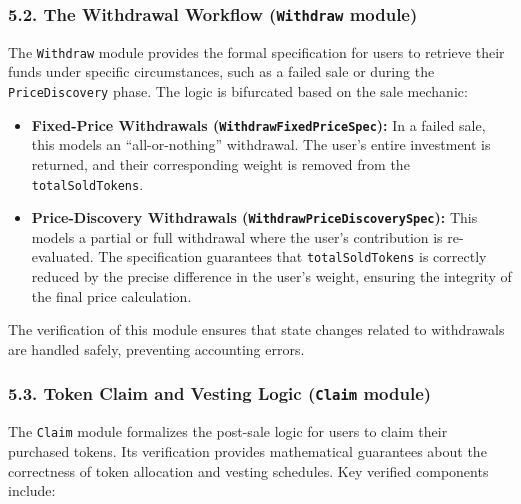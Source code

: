 \documentclass[
  english,
  onecolumn]{article}
\providecommand{\tightlist}{%
  \setlength{\itemsep}{0pt}\setlength{\parskip}{0pt}}
\begin{document}
\subsubsection{\texorpdfstring{5.2. The Withdrawal Workflow
(\texttt{Withdraw}
module)}{5.2. The Withdrawal Workflow (Withdraw module)}}\label{the-withdrawal-workflow-withdraw-module}

The \texttt{Withdraw} module provides the formal specification for users
to retrieve their funds under specific circumstances, such as a failed
sale or during the \texttt{PriceDiscovery} phase. The logic is
bifurcated based on the sale mechanic:

\begin{itemize}
\tightlist
\item
  \textbf{Fixed-Price Withdrawals (\texttt{WithdrawFixedPriceSpec}):} In
  a failed sale, this models an ``all-or-nothing'' withdrawal. The
  user's entire investment is returned, and their corresponding weight
  is removed from the \texttt{totalSoldTokens}.
\item
  \textbf{Price-Discovery Withdrawals
  (\texttt{WithdrawPriceDiscoverySpec}):} This models a partial or full
  withdrawal where the user's contribution is re-evaluated. The
  specification guarantees that \texttt{totalSoldTokens} is correctly
  reduced by the precise difference in the user's weight, ensuring the
  integrity of the final price calculation.
\end{itemize}

The verification of this module ensures that state changes related to
withdrawals are handled safely, preventing accounting errors.

\subsubsection{\texorpdfstring{5.3. Token Claim and Vesting Logic
(\texttt{Claim}
module)}{5.3. Token Claim and Vesting Logic (Claim module)}}\label{token-claim-and-vesting-logic-claim-module}

The \texttt{Claim} module formalizes the post-sale logic for users to
claim their purchased tokens. Its verification provides mathematical
guarantees about the correctness of token allocation and vesting
schedules. Key verified components include:
\end{document}
